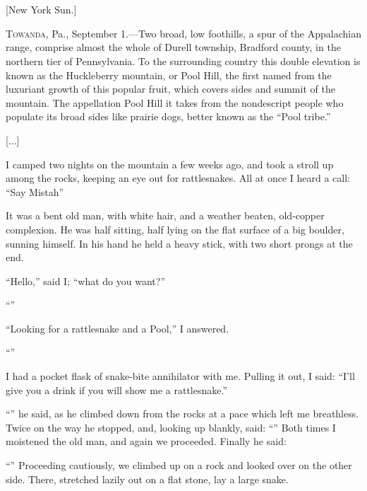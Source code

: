 \begin{ipquote}
\begin{center}
\\
\\
{[New York Sun.]}
\end{center}
{\textsc{Towanda}, Pa., September 1.—Two broad, low foothills, a spur of the Appalachian range, comprise almost the whole of Durell township, Bradford county, in the northern tier of Pennsylvania. To the surrounding country this double elevation is known as the Huckleberry mountain, or Pool Hill, the first named from the luxuriant growth of this popular fruit, which covers sides and summit of the mountain. The appellation Pool Hill it takes from the nondescript people who populate its broad sides like prairie dogs, better known as the “Pool tribe.”

\centering
{[...]}    

I camped two nights on the mountain a few weeks ago, and took a stroll up among the rocks, keeping an eye out for rattlesnakes. All at once I heard a call: “Say Mistah”}

It was a bent old man, with white hair, and a weather beaten, old-copper complexion. He was half sitting, half lying on the flat surface of a big boulder, sunning himself. In his hand he held a heavy stick, with two short prongs at the end.

“Hello,” said I; “what do you want?”

“”

“Looking for a rattlesnake and a Pool,” I answered.

“”

I had a pocket flask of snake-bite annihilator with me. Pulling it out, I said: “I’ll give you a drink if you will show me a rattlesnake.”

“” he said, as he climbed down from the rocks at a pace which left me breathless. Twice on the way he stopped, and, looking up blankly, said: “” Both times I moistened the old man, and again we proceeded. Finally he said:

“” Proceeding cautiously, we climbed up on a rock and looked over on the other side. There, stretched lazily out on a flat stone, lay a large snake.


\end{ipquote}
